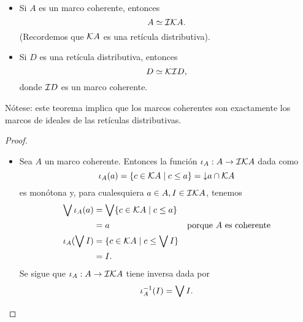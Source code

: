 \begin{thm}
    \begin{itemize}
        \item Si $A$ es un marco coherente, entonces
        \[
            A\simeq \cal I\cal KA
        .\]
        (Recordemos que $\cal KA$ es una retícula distributiva).
        \item Si $D$ es una retícula distributiva, entonces
        \[
            D \simeq \cal K\cal ID
        ,\]
        donde $\cal ID$ es un marco coherente.
    \end{itemize}
    Nótese: este teorema implica que los marcos coherentes
    son exactamente los marcos de ideales de las retículas
    distributivas.
\end{thm}
\begin{proof}
    \begin{itemize}
        \item
        Sea $A$ un marco coherente.
        Entonces la función $\iota_A:A\to\cal I\cal KA$ dada como
        \[
            \iota_A(a) = \{c\in\cal KA\mid c\leq a\}
            =\down a\cap\cal KA
        \]
        es monótona y, para cualesquiera $a\in A, I\in\cal I\cal KA$,
        tenemos
        \begin{align*}
            \Sup\iota_A(a)
            &= \Sup\{c\in\cal KA\mid c\leq a\} \\
            &= a & \text{porque $A$ es coherente} \\
            \iota_A(\Sup I)
            &= \{c\in\cal KA\mid c\leq \Sup I\} \\
            &= I.
        \end{align*}
        Se sigue que $\iota_A:A\to\cal I\cal KA$ tiene inversa
        dada por
        \[
            \iota_A^{-1}(I) = \Sup I
        .\]
        

\end{itemize}
\end{proof}
